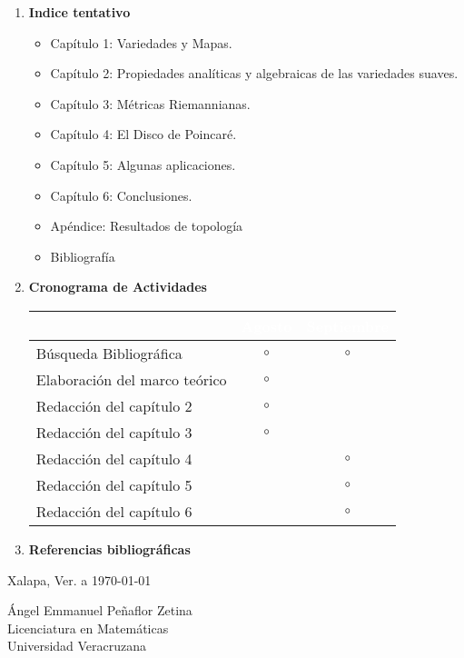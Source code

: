 \documentclass[
  12pt,
  letterpaper,
  spanish
]{article}
\newcommand{\alumno}{Ángel Emmanuel Peñaflor Zetina}
\begin{document}
\begin{enumerate}
\item \textbf{Indice tentativo}

    \begin{itemize}
      \item Capítulo 1: Variedades y Mapas.
      \item Capítulo 2: Propiedades analíticas y algebraicas de las variedades suaves.
      \item Capítulo 3: Métricas Riemannianas.
      \item Capítulo 4: El Disco de Poincaré.
      \item Capítulo 5: Algunas aplicaciones.
      \item Capítulo 6: Conclusiones.
      \item Apéndice: Resultados de topología
      \item Bibliografía
    \end{itemize}

  \item \textbf{Cronograma de Actividades}

\begin{table}[H]
\centering
  \begin{adjustbox}{max width=\textwidth}
  \begin{tabular}{|l|c|c|}
  \rowcolor[HTML]{004B7E} 
  & \textcolor{White}{Agosto}  & \textcolor{White}{Septiembre} \\ \hline
  Búsqueda Bibliográfica        & $\circ$ & $\circ$ \\ \hline
  Elaboración del marco teórico & $\circ$ &   \\ \hline
  Redacción del capítulo 2      & $\circ$ &   \\ \hline
  Redacción del capítulo 3      & $\circ$ &   \\ \hline
  Redacción del capítulo 4      &   & $\circ$ \\ \hline
  Redacción del capítulo 5      &   & $\circ$ \\ \hline
  Redacción del capítulo 6      &   & $\circ$ \\ \hline
  \end{tabular}
  \end{adjustbox}
\end{table}

\item \textbf{Referencias bibliográficas}
  
  \printbibliography[heading=none]
\end{enumerate}

\vspace{24pt}

\noindent Xalapa, Ver. a \today

\vspace{24pt}

\noindent\alumno \\
Licenciatura en Matemáticas \\
Universidad Veracruzana \\
\end{document}
